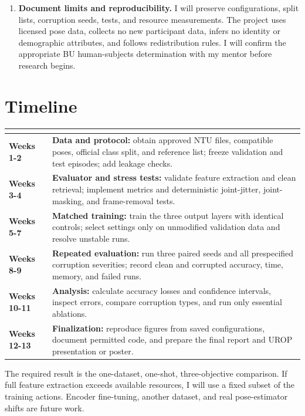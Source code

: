 \documentclass[10pt]{article}
\begin{document}
\begin{enumerate}
  \item \textbf{Document limits and reproducibility.} I will preserve configurations, split lists, corruption seeds, tests, and resource measurements. The project uses licensed pose data, collects no new participant data, infers no identity or demographic attributes, and follows redistribution rules. I will confirm the appropriate BU human-subjects determination with my mentor before research begins.
\end{enumerate}

\section*{Timeline}

{\small
\renewcommand{\arraystretch}{1.18}
\begin{tabularx}{\textwidth}{@{}>{\bfseries}p{0.92in}Y@{}}
  \toprule
   & \textbf{} \\
  \midrule
  Weeks 1-2 & \textbf{Data and protocol:} obtain approved NTU files, compatible poses, official class split, and reference list; freeze validation and test episodes; add leakage checks. \\
  Weeks 3-4 & \textbf{Evaluator and stress tests:} validate feature extraction and clean retrieval; implement metrics and deterministic joint-jitter, joint-masking, and frame-removal tests. \\
  Weeks 5-7 & \textbf{Matched training:} train the three output layers with identical controls; select settings only on unmodified validation data and resolve unstable runs. \\
  Weeks 8-9 & \textbf{Repeated evaluation:} run three paired seeds and all prespecified corruption severities; record clean and corrupted accuracy, time, memory, and failed runs. \\
  Weeks 10-11 & \textbf{Analysis:} calculate accuracy losses and confidence intervals, inspect errors, compare corruption types, and run only essential ablations. \\
  Weeks 12-13 & \textbf{Finalization:} reproduce figures from saved configurations, document permitted code, and prepare the final report and UROP presentation or poster. \\
  \bottomrule
\end{tabularx}}

The required result is the one-dataset, one-shot, three-objective comparison. If full feature extraction exceeds available resources, I will use a fixed subset of the training actions. Encoder fine-tuning, another dataset, and real pose-estimator shifts are future work.
\end{document}
